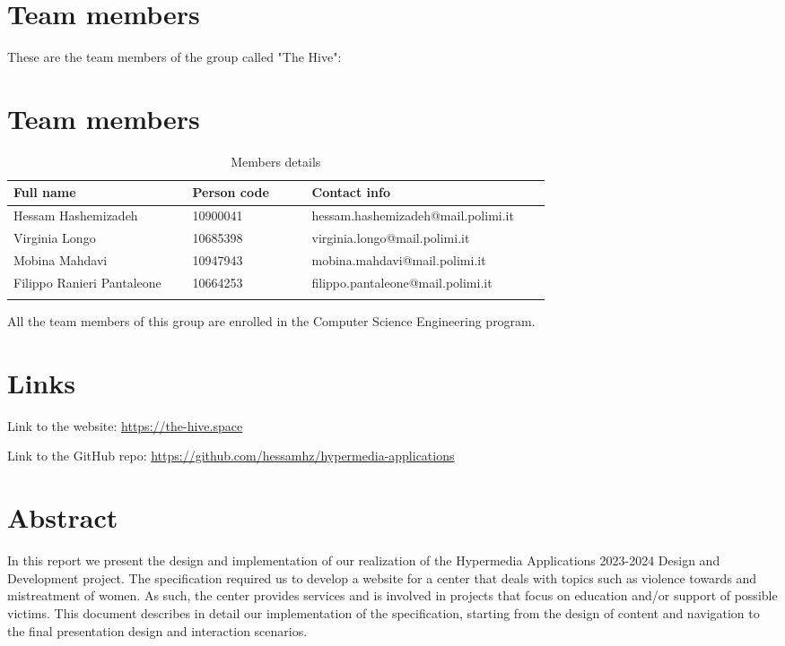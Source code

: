 \section{Team members}
These are the team members of the group called "The Hive":
\section{Team members}
\begin{longtable}
    {|m{0.3\linewidth}|m{0.2\linewidth}|m{0.4\linewidth}|}
            \hline
            \textbf{Full name} & \textbf{Person code} & \textbf{Contact info}\\
            \hline
            \endhead
                Hessam Hashemizadeh & 10900041 & hessam.hashemizadeh@mail.polimi.it \\
            \hline
                Virginia Longo & 10685398 & virginia.longo@mail.polimi.it \\
            \hline
                Mobina Mahdavi & 10947943 & mobina.mahdavi@mail.polimi.it \\
            \hline
                Filippo Ranieri Pantaleone & 10664253 & filippo.pantaleone@mail.polimi.it \\
            \hline
            \caption{Members details}
            \label{table:mem_details}
\end{longtable}

All the team members of this group are enrolled in the Computer Science Engineering program.

\section{Links}
Link to the website: \url{https://the-hive.space}

Link to the GitHub repo: \url{https://github.com/hessamhz/hypermedia-applications}

\section{Abstract}
In this report we present the design and implementation of our realization of the Hypermedia Applications 2023-2024 Design and Development project. The specification required us to develop a website for a center that deals with topics such as violence towards and mistreatment of women. As such, the center provides services and is involved in projects that focus on education and/or support of possible victims. This document describes in detail our implementation of the specification, starting from the design of content and navigation to the final presentation design and interaction scenarios.
